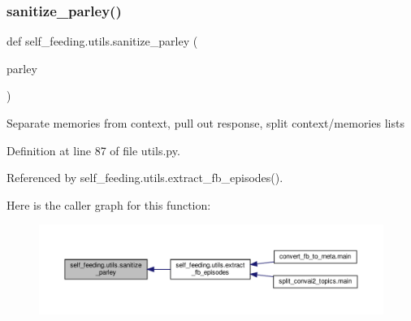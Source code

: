 \subsubsection{\texorpdfstring{sanitize\+\_\+parley()}{sanitize\_parley()}}
{\footnotesize\ttfamily def self\+\_\+feeding.\+utils.\+sanitize\+\_\+parley (\begin{DoxyParamCaption}\item[{}]{parley }\end{DoxyParamCaption})}

\begin{DoxyVerb}Separate memories from context, pull out response, split context/memories lists
\end{DoxyVerb}
 

Definition at line 87 of file utils.\+py.



Referenced by self\+\_\+feeding.\+utils.\+extract\+\_\+fb\+\_\+episodes().

Here is the caller graph for this function\+:
\nopagebreak
\begin{figure}[H]
\begin{center}
\leavevmode
\includegraphics[width=350pt]{namespaceself__feeding_1_1utils_a6c6383b2b208a5cf7d3d043376411034_icgraph}
\end{center}
\end{figure}
